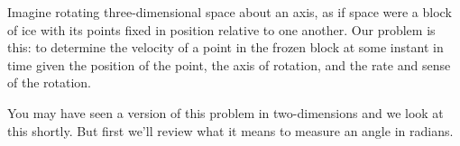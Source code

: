 \documentclass{ximera}
\begin{document}
Imagine rotating three-dimensional space about an axis, as if space were a block of ice with its points fixed in position relative to one another. Our problem is this: to determine the velocity of a point in the frozen block at some instant in time given the position of the point, the axis of rotation, and the rate and sense of the rotation.

 
\begin{onlineOnly}
    \begin{center}
\end{center}
\end{onlineOnly}





You may have seen a version of this problem in two-dimensions and we look at this shortly. But first we'll review what it means to measure an angle in radians.
\end{document}
